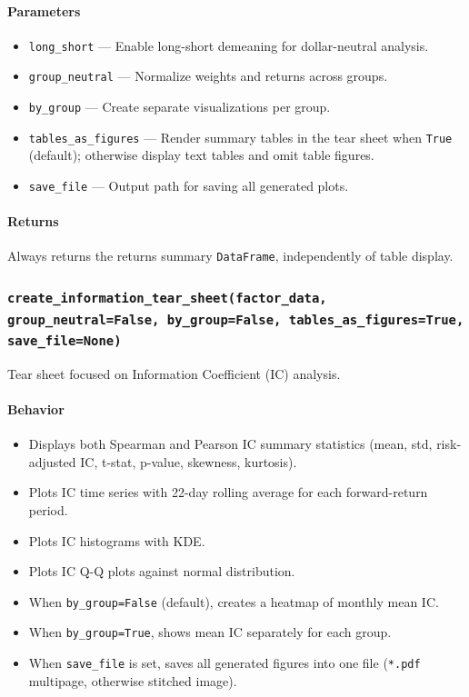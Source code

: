 \documentclass[11pt]{article}
\begin{document}
\paragraph{Parameters}
\begin{itemize}
  \item \texttt{long\_short} --- Enable long-short demeaning for dollar-neutral analysis.
  \item \texttt{group\_neutral} --- Normalize weights and returns across groups.
  \item \texttt{by\_group} --- Create separate visualizations per group.
  \item \texttt{tables\_as\_figures} --- Render summary tables in the tear sheet when \texttt{True} (default); otherwise display text tables and omit table figures.
  \item \texttt{save\_file} --- Output path for saving all generated plots.
\end{itemize}

\paragraph{Returns}
Always returns the returns summary \texttt{DataFrame}, independently of table display.

\subsubsection{\texttt{create\_information\_tear\_sheet(factor\_data, group\_neutral=False, by\_group=False, tables\_as\_figures=True, save\_file=None)}}
Tear sheet focused on Information Coefficient (IC) analysis.

\paragraph{Behavior}
\begin{itemize}
  \item Displays both Spearman and Pearson IC summary statistics (mean, std, risk-adjusted IC, t-stat, p-value, skewness, kurtosis).
  \item Plots IC time series with 22-day rolling average for each forward-return period.
  \item Plots IC histograms with KDE.
  \item Plots IC Q-Q plots against normal distribution.
  \item When \texttt{by\_group=False} (default), creates a heatmap of monthly mean IC.
  \item When \texttt{by\_group=True}, shows mean IC separately for each group.
  \item When \texttt{save\_file} is set, saves all generated figures into one file (\texttt{*.pdf} multipage, otherwise stitched image).
\end{itemize}
\end{document}
